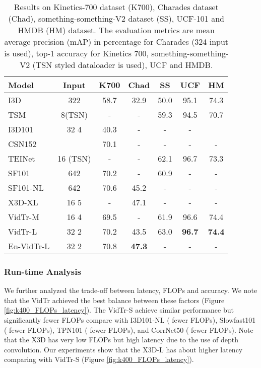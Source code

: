 \documentclass[10pt,twocolumn,letterpaper]{article}
\begin{document}
\begin{table}[t!]
\footnotesize
    \begin{center}
        \begin{tabularx}{\columnwidth}{l|c|c|c|c|c|c} 
	    \toprule
		Model        & Input   & K700 &  Chad & SS & UCF & HM\\ 
		\midrule
		I3D~\cite{carreira2017quo} & 322 & 58.7  & 32.9& 50.0 &95.1 & 74.3\\
		TSM~\cite{lin2019tsm} & 8(TSN)  & - & -& 59.3 &94.5 & 70.7\\
		I3D101~\cite{yang_CVPR2020_TPN} & 32  4 & 40.3& - &-&- \\
		CSN152~\cite{tran2019video} &    & 70.1  & - & - & - & - \\ 
        TEINet\cite{liu_AAAI2020_TEINet} & 16 (TSN)  &-& - & 62.1 &96.7 & 73.3\\
        SF101~\cite{feichtenhofer2018slowfast} & 642  & 70.2 & -& 60.9&-&-\\
        SF101-NL~\cite{feichtenhofer2018slowfast} & 642 & 70.6 & 45.2&-&-&-\\
        X3D-XL~\cite{feichtenhofer2020x3d} & 16  5  & - & 47.1&-&-&-\\
        \midrule
        VidTr-M & 16  4 & 69.5 & - & 61.9 & 96.6 & 74.4\\
		VidTr-L & 32  2  & 70.2&43.5 & 63.0 & \textbf{96.7} & \textbf{74.4}\\
		En-VidTr-L & 32  2  & 70.8& \textbf{47.3} & - & - & - \\
		\bottomrule
	\end{tabularx}
    \end{center}
	\caption{Results on Kinetics-700 dataset (K700), Charades dataset (Chad), something-something-V2 dataset (SS), UCF-101 and HMDB (HM) dataset. The evaluation metrics are mean average precision (mAP) in percentage for Charades (324 input is used), top-1 accuracy for Kinetics 700, something-something-V2 (TSN styled dataloader is used), UCF and HMDB.} 
	\label{tab:charades_res}
\end{table}

\subsubsection{Run-time Analysis}
We further analyzed the trade-off between latency, FLOPs and accuracy.
We note that the VidTr achieved the best balance between these factors (Figure \ref{fig:k400_FLOPs_latency}). The VidTr-S achieve similar performance but significantly fewer FLOPs compare with I3D101-NL ( fewer FLOPs), Slowfast101  ( fewer FLOPs), TPN101 ( fewer FLOPs), and CorrNet50 ( fewer FLOPs). Note that the X3D has very low FLOPs but high latency due to the use of depth convolution. Our experiments show that the X3D-L has about  higher latency comparing with VidTr-S (Figure \ref{fig:k400_FLOPs_latency}).
\end{document}
